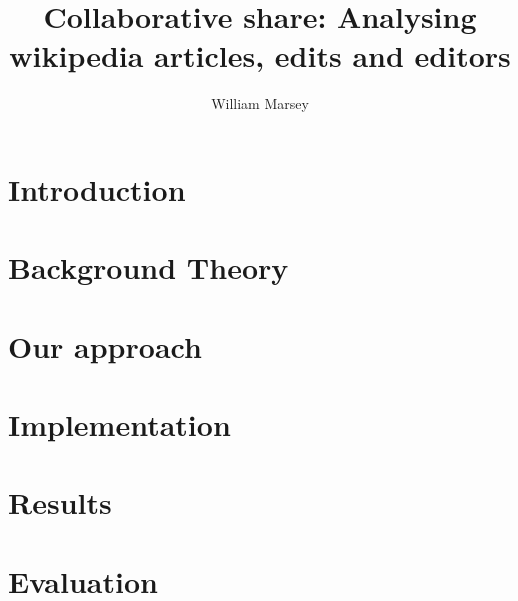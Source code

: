 \documentclass[a4paper,11pt,twoside]{report}
\begin{document}
\title{\LARGE {\bf Collaborative share: Analysing wikipedia articles,
    edits and editors}\\
 \vspace*{6mm}
}

\author{William Marsey}

\normallinespacing
\maketitle

\preface



\body
\chapter{Introduction}
\label{ch:introduction}


\chapter{Background Theory}
\label{ch:background}




\chapter{Our approach}




\chapter{Implementation}
\label{ch:implementation}




\chapter{Results}
\label{ch:results}




\chapter{Evaluation}
\label{ch:evaluation}



\end{document}
